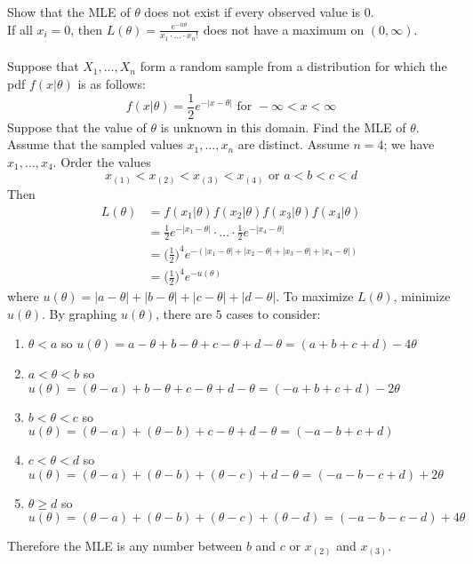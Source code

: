 \documentclass[12pt]{article}
\begin{document}
Show that the MLE of $\theta$ does not exist if every observed value is $0$. \\ 
If all $x_i = 0$, then $L(\theta) = \frac{e^{-n\theta}}{x_1 \cdot \dots \cdot x_n!}$ does not have a maximum on $(0,\infty)$. \\~\\
Suppose that $X_1,\dots,X_n$ form a random sample from a distribution for which the pdf $f(x|\theta)$ is as follows: $$f(x|\theta) = \frac{1}{2}e^{-|x-\theta|} \text{  for  } -\infty < x < \infty $$ Suppose that the value of $\theta$ is unknown in this domain. Find the MLE of $\theta$. \\
Assume that the sampled values $x_1,\dots,x_n$ are distinct. Assume $n=4$; we have $x_1, \dots, x_4$. Order the values $$x_{(1)} < x_{(2)} < x_{(3)} < x_{(4)} \text{ or } a < b < c < d $$ Then $$\begin{aligned} L(\theta) &= f(x_1|\theta)f(x_2|\theta)f(x_3|\theta)f(x_4|\theta) \\ &= \frac{1}{2} e^{-|x_1 - \theta|} \cdot \dots \cdot \frac{1}{2} e^{-|x_4 - \theta|} \\ &= \Big( \frac{1}{2} \Big)^4 e^{-(|x_1 - \theta| + |x_2 -\theta| + |x_3 - \theta| + |x_4 - \theta|)} \\ &= \Big( \frac{1}{2} \Big)^4 e^{-u(\theta)} \end{aligned} $$ where $u(\theta) = |a - \theta| + |b-\theta| + |c-\theta| + |d-\theta|$. To maximize $L(\theta)$, minimize $u(\theta)$. By graphing $u(\theta)$, there are $5$ cases to consider: \begin{enumerate} 
\item $\theta < a$ so $u(\theta) = a - \theta + b - \theta + c - \theta + d - \theta = (a + b + c + d) - 4\theta$
\item $a< \theta < b$ so $u(\theta) = (\theta - a) + b - \theta + c - \theta + d - \theta = (-a + b + c + d) - 2\theta $
\item $b < \theta < c$ so $u(\theta) = (\theta - a) + (\theta - b) + c - \theta + d - \theta = (-a -b + c + d)$ 
\item $c < \theta < d$ so $u(\theta) = (\theta - a) + (\theta - b) + (\theta - c) + d - \theta = (-a - b - c + d) + 2\theta$ 
\item $\theta \geq d$ so $u(\theta) = (\theta - a) + (\theta - b) + (\theta - c) + (\theta - d) = (-a-b-c-d) + 4\theta$ \end{enumerate} 
Therefore the MLE is any number between $b$ and $c$ or $x_{(2)}$ and $x_{(3)}$. \\
\end{document}
